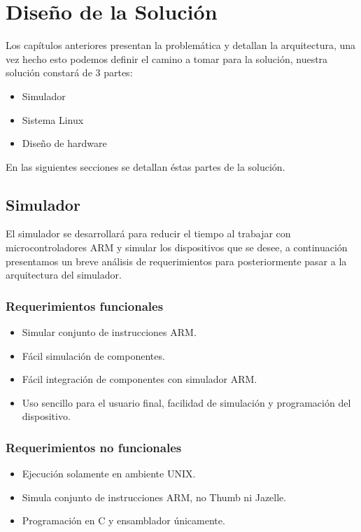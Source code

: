 \chapter{Dise\~no de la Soluci\'on}\label{ch:solution}

Los capítulos anteriores presentan la problemática y detallan la arquitectura, una vez hecho esto podemos definir el camino a tomar para la solución, nuestra solución constará de 3 partes:

\begin{itemize}
\item Simulador
\item Sistema Linux
\item Diseño de hardware
\end{itemize}

En las siguientes secciones se detallan éstas partes de la solución.

\section{Simulador}

El simulador se desarrollará para reducir el tiempo al trabajar con microcontroladores \ac{ARM} y simular los dispositivos que se desee, a continuación presentamos un breve análisis de requerimientos para posteriormente pasar a la arquitectura del simulador.

\subsection{Requerimientos funcionales}

\begin{itemize}
\item Simular conjunto de instrucciones \ac{ARM}.
\item Fácil simulación de componentes.
\item Fácil integración de componentes con simulador ARM.
\item Uso sencillo para el usuario final, facilidad de simulación y programación del dispositivo.
\end{itemize}

\subsection{Requerimientos no funcionales}

\begin{itemize}
\item Ejecución solamente en ambiente UNIX.
\item Simula conjunto de instrucciones ARM, no Thumb ni Jazelle.
\item Programación en C y ensamblador únicamente.
\end{itemize}

